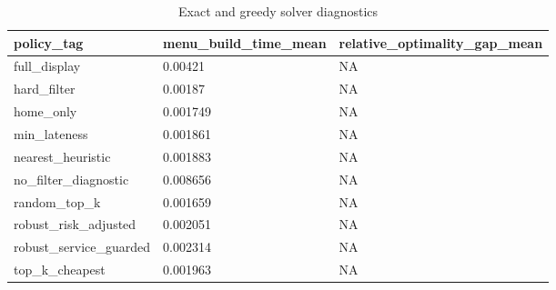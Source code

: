 \begin{table}[ht]
\centering
\begin{tabular}{lll}
 \hline
policy\_tag & menu\_build\_time\_mean & relative\_optimality\_gap\_mean \\
 \hline
full\_display & 0.00421 & NA \\
hard\_filter & 0.00187 & NA \\
home\_only & 0.001749 & NA \\
min\_lateness & 0.001861 & NA \\
nearest\_heuristic & 0.001883 & NA \\
no\_filter\_diagnostic & 0.008656 & NA \\
random\_top\_k & 0.001659 & NA \\
robust\_risk\_adjusted & 0.002051 & NA \\
robust\_service\_guarded & 0.002314 & NA \\
top\_k\_cheapest & 0.001963 & NA \\
 \hline
\end{tabular}
\caption{Exact and greedy solver diagnostics}
\end{table}
